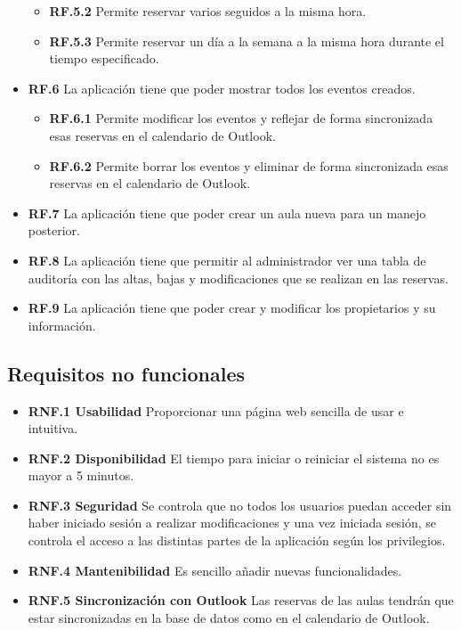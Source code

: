 \begin{itemize}
\begin{itemize}
        \item \textbf{RF.5.2} Permite reservar varios seguidos a la misma hora.
        \item \textbf{RF.5.3} Permite reservar un día a la semana a la misma hora durante el tiempo especificado. 
    \end{itemize}
    \item \textbf{RF.6} La aplicación tiene que poder mostrar todos los eventos creados.
    \begin{itemize}
        \item \textbf{RF.6.1} Permite modificar los eventos y reflejar de forma sincronizada esas reservas en el calendario de Outlook.
        \item \textbf{RF.6.2} Permite borrar los eventos y eliminar de forma sincronizada esas reservas en el calendario de Outlook.
    \end{itemize}
    \item \textbf{RF.7} La aplicación tiene que poder crear un aula nueva para un manejo posterior.
    \item \textbf{RF.8} La aplicación tiene que permitir al administrador ver  una tabla de auditoría con las altas, bajas y modificaciones que se realizan en las reservas.
    \item \textbf{RF.9} La aplicación tiene que poder crear y modificar los propietarios y su información.
    
\end{itemize}

\subsection{Requisitos no funcionales}
\begin{itemize}
	\item \textbf{RNF.1 Usabilidad} Proporcionar una página web sencilla de usar e intuitiva.
	\item \textbf{RNF.2 Disponibilidad} El tiempo para iniciar o reiniciar el sistema no es mayor a 5 minutos.
	\item \textbf{RNF.3 Seguridad} Se controla que no todos los usuarios puedan acceder sin haber iniciado sesión a realizar modificaciones y una vez iniciada sesión, se controla el acceso a las distintas partes de la aplicación según los privilegios.
	\item \textbf{RNF.4 Mantenibilidad} Es sencillo añadir nuevas funcionalidades.
	\item \textbf{RNF.5 Sincronización con Outlook} Las reservas de las aulas tendrán que estar sincronizadas en la base de datos como en el calendario de Outlook.
\end{itemize}
\newpage
